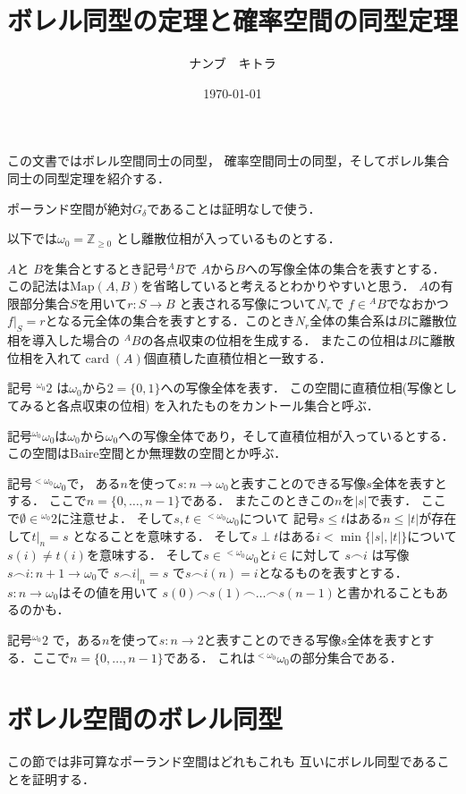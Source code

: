 \documentclass[leqno, 12pt]{jsarticle}
\title{ボレル同型の定理と確率空間の同型定理}
\author{ナンブ　キトラ}
\date{\today}
\newcommand{\zz}{\mathbb{Z}}
\DeclareMathOperator{\card}{card}
\newcommand{\myomega}{\omega_{0}}
\newcommand{\mycantor}{{}^{\myomega}2}
\newcommand{\mybairetb}{{}^{<\myomega}\myomega}
\newcommand{\mybaire}{{}^{\myomega}\myomega}
\newcommand{\myff}{\frown}
\newcommand{\mynbd}[1]{N_{#1}}
\begin{document}
\maketitle
この文書ではボレル空間同士の同型，
確率空間同士の同型，そしてボレル集合同士の同型定理を紹介する．


ポーランド空間が絶対$G_{\delta}$であることは証明なしで使う．


以下では$\myomega=\zz_{\ge 0}$
とし離散位相が入っているものとする．


$A$と
$B$を集合とするとき記号${}^{A}B$で
$A$から$B$への写像全体の集合を表すとする．
この記法は$\mathrm{Map}(A, B)$を省略していると考えるとわかりやすいと思う．
$A$の有限部分集合$S$を用いて$r\colon S\to B$
と表される写像について$\mynbd{r}$で
$f\in {}^{A}B$でなおかつ$f|_{S}=r$となる元全体の集合を表すとする．このとき$\mynbd{r}$全体の集合系は$B$に離散位相を導入した場合の
${}^{A}B$の各点収束の位相を生成する．
またこの位相は$B$に離散位相を入れて$\card(A)$個直積した直積位相と一致する．

記号
$\mycantor$
は$\myomega$から$2=\{0, 1\}$への写像全体を表す．
この空間に直積位相(写像としてみると各点収束の位相)
を入れたものをカントール集合と呼ぶ．


記号$\mybaire$は$\myomega$から$\myomega$への写像全体であり，そして直積位相が入っているとする．
この空間はBaire空間とか無理数の空間とか呼ぶ．



記号$\mybairetb$で，
ある$n$を使って$s\colon n\to \myomega$と表すことのできる写像$s$全体を表すとする．
ここで$n=\{0, \dots, n-1\}$である．
またこのときこの$n$を$|s|$で表す．
ここで$\emptyset\in \mycantor$に注意せよ．
そして$s, t\in \mybairetb$について
記号$s\le t$はある$n\le |t|$が存在して$t|_{n}=s$
となることを意味する．
そして$s\perp t$はある$i<\min\{|s|, |t|\}$について
$s(i)\neq t(i)$を意味する．
そして$s\in \mybairetb$と$i\in $に対して
$s\myff i$
は写像
$s\myff 
i\colon n+1\to \myomega$で
$s\myff i|_{n}=s$
で$s\myff i(n)=i$となるものを表すとする．
$s\colon n\to \myomega$はその値を用いて
$s(0)\myff s(1)\myff \dots\myff s(n-1)$と書かれることもあるのかも．


記号$\mycantor$
で，ある$n$を使って$s\colon n\to 2$と表すことのできる写像$s$全体を表すとする．ここで$n=\{0, \dots, n-1\}$である．
これは$\mybairetb$の部分集合である．





\section{ボレル空間のボレル同型}\label{sec:bb}
この節では非可算なポーランド空間はどれもこれも
互いにボレル同型であることを証明する．
\end{document}
